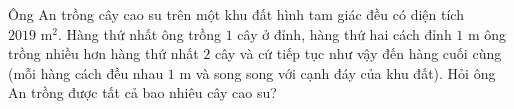 \begin{ex}
Ông An trồng cây cao su trên một khu đất hình tam giác đều có diện tích $2019\text{ m}^2$. Hàng thứ nhất ông trồng $1$ cây ở đỉnh, hàng thứ hai cách đỉnh $1$ m ông trồng nhiều hơn hàng thứ nhất $2$ cây và cứ tiếp tục như vậy đến hàng cuối cùng (mỗi hàng cách đều nhau $1$ m và song song với cạnh đáy của khu đất). Hỏi ông An trồng được tất cả bao nhiêu cây cao su?
\end{ex}

